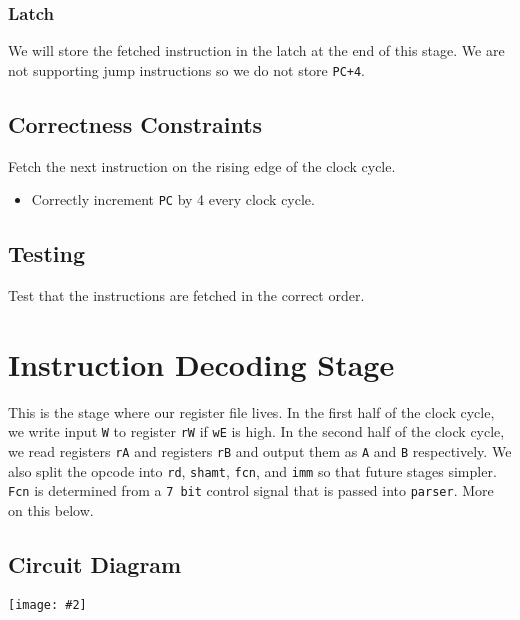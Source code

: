 \documentclass[10pt]{article}
\newcommand{\diagram}[2][1]{\begin{center}\texttt{[image: \#2]}\end{center}}
\begin{document}
\subsubsection{Latch}
We will store the fetched instruction in the latch at the end of this stage. We are not supporting jump instructions so we do not store \texttt{PC+4}.

\subsection{Correctness Constraints}
Fetch the next instruction on the rising edge of the clock cycle. 
\begin{itemize}
\item Correctly increment \texttt{PC} by 4 every clock cycle.
\end{itemize}

\subsection{Testing}
Test that the instructions are fetched in the correct order.

\section{Instruction Decoding Stage}
This is the stage where our register file lives. In the first half of the clock cycle, we write input \texttt{W} to register \texttt{rW} if \texttt{wE} is high. 
In the second half of the clock cycle, we read registers \texttt{rA} and registers \texttt{rB} and output them as \texttt{A} and \texttt{B} respectively.
We also split the opcode into \texttt{rd}, \texttt{shamt}, \texttt{fcn}, and \texttt{imm} so that future stages simpler.
\texttt{Fcn} is determined from a \texttt{7 bit} control signal that is passed into \texttt{parser}. More on this below.
\subsection{Circuit Diagram}
\diagram[0.8]{decode}
\end{document}

